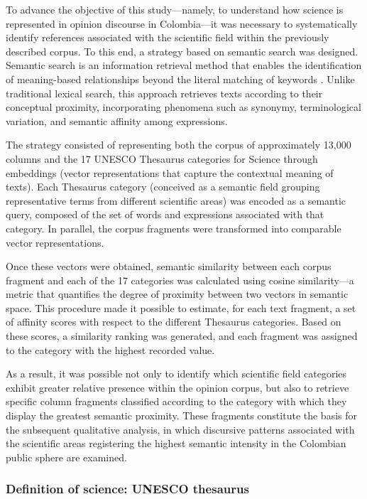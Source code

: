 \documentclass[11pt,a4paper]{article}
\begin{document}
	
To advance the objective of this study—namely, to understand how science is represented in opinion discourse in Colombia—it was necessary to systematically identify references associated with the scientific field within the previously described corpus. To this end, a strategy based on semantic search was designed. Semantic search is an information retrieval method that enables the identification of meaning-based relationships beyond the literal matching of keywords \cite{Wei2022}. Unlike traditional lexical search, this approach retrieves texts according to their conceptual proximity, incorporating phenomena such as synonymy, terminological variation, and semantic affinity among expressions.

The strategy consisted of representing both the corpus of approximately 13,000 columns and the 17 UNESCO Thesaurus categories for Science through embeddings (vector representations that capture the contextual meaning of texts). Each Thesaurus category (conceived as a semantic field grouping representative terms from different scientific areas) was encoded as a semantic query, composed of the set of words and expressions associated with that category. In parallel, the corpus fragments were transformed into comparable vector representations.


Once these vectors were obtained, semantic similarity between each corpus fragment and each of the 17 categories was calculated using cosine similarity—a metric that quantifies the degree of proximity between two vectors in semantic space. This procedure made it possible to estimate, for each text fragment, a set of affinity scores with respect to the different Thesaurus categories. Based on these scores, a similarity ranking was generated, and each fragment was assigned to the category with the highest recorded value.

As a result, it was possible not only to identify which scientific field categories exhibit greater relative presence within the opinion corpus, but also to retrieve specific column fragments classified according to the category with which they display the greatest semantic proximity. These fragments constitute the basis for the subsequent qualitative analysis, in which discursive patterns associated with the scientific areas registering the highest semantic intensity in the Colombian public sphere are examined.
	
\subsubsection{Definition of science: UNESCO thesaurus}
\end{document}
